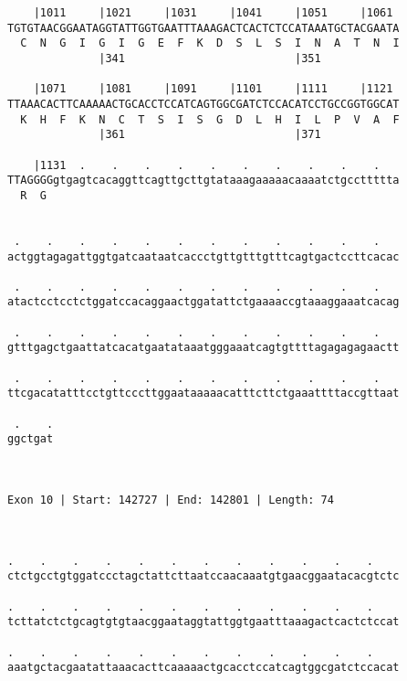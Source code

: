 \documentclass{article}
\begin{document}
\begin{Verbatim}
    |1011     |1021     |1031     |1041     |1051     |1061 
TGTGTAACGGAATAGGTATTGGTGAATTTAAAGACTCACTCTCCATAAATGCTACGAATA
  C  N  G  I  G  I  G  E  F  K  D  S  L  S  I  N  A  T  N  I
              |341                          |351            
  
    |1071     |1081     |1091     |1101     |1111     |1121 
TTAAACACTTCAAAAACTGCACCTCCATCAGTGGCGATCTCCACATCCTGCCGGTGGCAT
  K  H  F  K  N  C  T  S  I  S  G  D  L  H  I  L  P  V  A  F
              |361                          |371            
  
    |1131  .    .    .    .    .    .    .    .    .    .   
TTAGGGGgtgagtcacaggttcagttgcttgtataaagaaaaacaaaatctgccttttta
  R  G                                                      
                                                            
  
 .    .    .    .    .    .    .    .    .    .    .    .   
actggtagagattggtgatcaataatcaccctgttgtttgtttcagtgactccttcacac
                                                            
 .    .    .    .    .    .    .    .    .    .    .    .   
atactcctcctctggatccacaggaactggatattctgaaaaccgtaaaggaaatcacag
                                                            
 .    .    .    .    .    .    .    .    .    .    .    .   
gtttgagctgaattatcacatgaatataaatgggaaatcagtgttttagagagagaactt
                                                            
 .    .    .    .    .    .    .    .    .    .    .    .   
ttcgacatatttcctgttcccttggaataaaaacatttcttctgaaattttaccgttaat
                                                            
 .    .
ggctgat
       
       
 
Exon 10 | Start: 142727 | End: 142801 | Length: 74



.    .    .    .    .    .    .    .    .    .    .    .    
ctctgcctgtggatccctagctattcttaatccaacaaatgtgaacggaatacacgtctc
                                                            
.    .    .    .    .    .    .    .    .    .    .    .    
tcttatctctgcagtgtgtaacggaataggtattggtgaatttaaagactcactctccat
                                                            
.    .    .    .    .    .    .    .    .    .    .    .    
aaatgctacgaatattaaacacttcaaaaactgcacctccatcagtggcgatctccacat
                                                            

\end{Verbatim}
\end{document}
